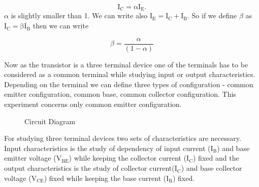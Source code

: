 \documentclass[12pt]{article}
\begin{document}
\begin{equation*}
\mathrm{I_C = \alpha I_E}
.\end{equation*}
\( \alpha \) is slightly smaller than 1. We can write also \( \mathrm{I_E = I_C + I_B}\). So if we define \( \beta \) as \( \mathrm{I_C = \beta I_B} \) then we can write 

\begin{equation*}
\beta = \frac{\alpha}{(1 - \alpha)} 
\end{equation*}

Now as the transistor is a three terminal device one of the terminals has to be considered as a common terminal while studying input or output characteristics. Depending on the terminal we can define three types of configuration - common emitter configuration, common base, common collector configuration. This experiment concerns only common emitter configuration.
\begin{figure}[!ht]
    \centering
    \caption{Circuit Diagram}
    \label{fig:my_label}
    \end{figure}
For studying three terminal devices two sets of characteristics are necessary. Input characteristics is the study of dependency of input current (\( \mathrm{I_B} \)) and base emitter voltage (\( \mathrm{V_{BE}} \)) while keeping the collector current (\( \mathrm{I_C}\)) fixed and the output characteristics is the study of collector current(\( \mathrm{I_C }\)) and base collector voltage (\( \mathrm{V_{CE}} \)) fixed while keeping the base current (\( \mathrm{I_B } \)) fixed.
\end{document}
